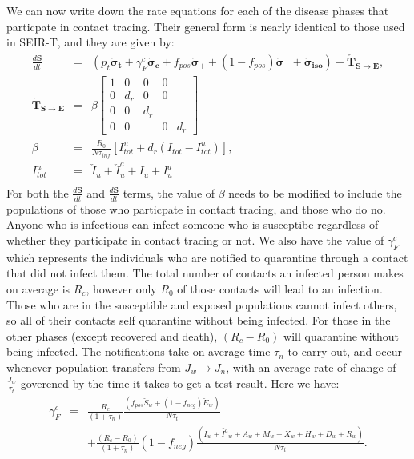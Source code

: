 \documentclass[notitlepage, superscriptaddress]{revtex4-2}
\begin{document}
We can now write down the rate equations for each of the disease phases that particpate in contact tracing. Their general form is nearly identical to those used in SEIR-T, and they are given by:
\begin{eqnarray}
\frac{d \boldsymbol{\check{S}}}{dt} &=& \left( p_{t} \boldsymbol{\check{\sigma}_{t}} + \gamma^{c}_{F} \boldsymbol{\check{\sigma}_{c}} + f_{pos} \boldsymbol{\check{\sigma}_{+}} + (1-f_{pos}) \boldsymbol{\check{\sigma}_{-}} + \boldsymbol{\check{\sigma}_{iso}} \right) - \boldsymbol{\check{T}_{S \rightarrow E}}, \\
%
\boldsymbol{\check{T}_{S \rightarrow E}} &=& \beta
    \begin{bmatrix}
    1 & 0 & 0 & 0 \\ 
    0 & d_{r} & 0 & 0 \\
    0 & 0 & d_{r} \\
    0 & 0 & & 0 & d_{r}
    \end{bmatrix} \\ 
%
\beta &=& \frac{R_{0}}{N\tau_{inf}} \left[ {I^{u}_{tot}} + d_{r} (I_{tot} - {I^{u}_{tot}}) \right], \\%
{I^{u}_{tot}} &=& {\check{I}_{u}} + {\check{I}^{a}_{u}}+ {{I}_{u}} + {{I}^{a}_{u}} \\ 
\end{eqnarray}
For both the $\frac{d \boldsymbol{\check{S}}}{dt}$ and $\frac{d \boldsymbol{\bar{S}}}{dt}$ terms, the value of $\beta$ needs to be modified to include the populations of those who particpate in contact tracing, and those who do no. Anyone who is infectious can infect someone who is susceptibe regardless of whether they participate in contact tracing or not. We also have the value of $\gamma^{c}_{F}$ which represents the individuals who are notified to quarantine through a contact that did not infect them. The total number of contacts an infected person makes on average is $R_{c}$, however only $R_{0}$ of those contacts will lead to an infection. Those who are in the susceptible and exposed populations cannot infect others, so all of their contacts self quarantine without being infected. For those in the other phases (except recovered and death), $(R_{c} - R_{0})$ will quarantine without being infected. The notifications take on average time $\tau_{n}$ to carry out, and occur whenever population transfers from $J_{w} \rightarrow J_{n}$, with an average rate of change of $\frac{J_{w}}{\tau_{t}}$ goverened by the time it takes to get a test result. Here we have:
\begin{eqnarray}
\gamma^{c}_{F} &=& \frac{R_{c}}{(1+\tau_{n})}\frac{(f_{pos} \check{S}_{w} + (1-f_{neg})\check{E}_{w})}{N \tau_{t}} \nonumber \\ 
&& + \frac{(R_{c} - R_{0})}{(1+\tau_{n})} (1-f_{neg}) \frac{(\check{I}_{w} + \check{I^{a}}_{w} + \check{A}_{w} + \check{M}_{w} + \check{X}_{w} + \check{H}_{w} + \check{D}_{w} + \check{R}_{w} )}{N \tau_{t}}.
\end{eqnarray} 
\end{document}
